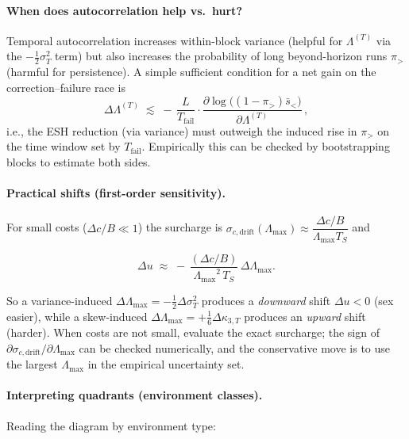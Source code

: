 \documentclass[11pt]{article}
\theoremstyle{upright}
\newcommand{\horizon}{\Lambda}
\newcommand{\Lmax}{\horizon^{(T)}_{\max}}
\newcommand{\hazT}[1]{\Lambda^{(#1)}}          %
\renewcommand{\Lmax}{\Lambda_{\max}}
\begin{document}
\paragraph{When does autocorrelation help vs.\ hurt?}
Temporal autocorrelation increases within-block variance (helpful for $\hazT{T}$ via the $-\tfrac12\sigma_T^2$ term) but also increases the probability of long beyond-horizon runs $\pi_{>}$ (harmful for persistence). A simple sufficient condition for a net gain on the correction–failure race is
\[
\Delta\hazT{T} \;\lesssim\; -\,\frac{L}{T_{\mathrm{fail}}}\cdot \frac{\partial \log\big((1-\pi_{>})\bar s_{<}\big)}{\partial \hazT{T}}\,,
\]
i.e., the ESH reduction (via variance) must outweigh the induced rise in $\pi_{>}$ on the time window set by $T_{\mathrm{fail}}$. Empirically this can be checked by bootstrapping blocks to estimate both sides.

\paragraph{Practical shifts (first-order sensitivity).}
For small costs ($\Delta c/B\ll 1$) the surcharge is $\sigma_{c,\mathrm{drift}}(\Lmax)\approx \dfrac{\Delta c/B}{\Lmax T_S}$ and

$$
\Delta u \;\approx\; -\,\frac{(\Delta c/B)}{{\Lmax}^2\,T_S}\,\Delta \Lmax.
$$

So a variance-induced $\Delta \Lmax=-\tfrac12\Delta\sigma_T^2$ produces a \emph{downward} shift $\Delta u<0$ (sex easier), while a skew-induced $\Delta \Lmax=+\tfrac16\Delta\kappa_{3,T}$ produces an \emph{upward} shift (harder). When costs are not small, evaluate the exact surcharge; the sign of $\partial \sigma_{c,\mathrm{drift}}/\partial \Lmax$ can be checked numerically, and the conservative move is to use the largest $\Lmax$ in the empirical uncertainty set.

\paragraph{Interpreting quadrants (environment classes).}
Reading the diagram by environment type:
\end{document}

